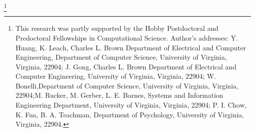 \documentclass[acmlarge]{acmart}
\begin{document}
\begin{abstract}
\end{abstract}


%
%

%
%




\thanks{This research was partly supported by the Hobby Postdoctoral and Predoctoral Fellowships in Computational Science. 
 Author's addresses: Y. Huang, K. Leach, Charles L. Brown Department of Electrical and Computer Engineering, Department of Computer Science, University of Virginia, Virginia, 22904; J. Gong, Charles L. Brown Department of Electrical and Computer Engineering, University of Virginia, Virginia, 22904; W. Bonelli,Department of Computer Science, University of Virginia, Virginia, 22904;M. Rucker, M. Gerber, L. E. Barnes, Systems and Information Engineering Department, University of Virginia, Virginia, 22904; P. I. Chow, K. Fua, B. A. Teachman,  Department of Psychology, University of Virginia, Virginia, 22904.}


\maketitle

\renewcommand{\shortauthors}{Y. Huang et al.}


\end{document}
